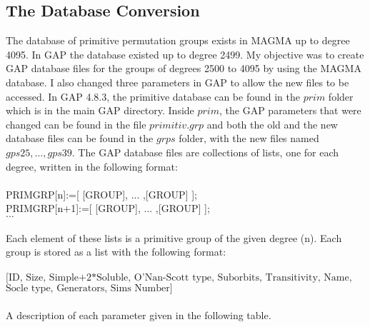 \documentclass[]{article}
\theoremstyle{definition}
\begin{document}
\subsection{The Database Conversion} \label{sec:databaseconversion}
The database of primitive permutation groups exists in MAGMA up to degree 4095. In GAP the database existed up to degree 2499. My objective was to create GAP database files for the groups of degrees 2500 to 4095 by using the MAGMA database. I also changed three parameters in GAP to allow the new files to be accessed. In GAP 4.8.3, the primitive database can be found in the $prim$ folder which is in the main GAP directory. Inside $prim$, the GAP parameters that were changed can be found in the file $primitiv.grp$ and both the old and the new database files can be found in the $grps$ folder, with the new files named $gps25, \dots , gps39$. The GAP database files are collections of lists, one for each degree, written in the following format: \\
\\
PRIMGRP[n]:=[ [GROUP], ... ,[GROUP] ]; \\
PRIMGRP[n+1]:=[ [GROUP], ... ,[GROUP] ]; \\
$\dots$ \\
\\
Each element of these lists is a primitive group of the given degree (n). Each group is stored as a list with the following format: \\
\\
$[ \mbox{ID, Size, Simple+2*Soluble, O'Nan-Scott type, Suborbits, Transitivity, Name,}$ \\ $\mbox{Socle type, Generators, Sims Number} ]$ \\
\\
A description of each parameter given in the following table. \\
\\
\end{document}
